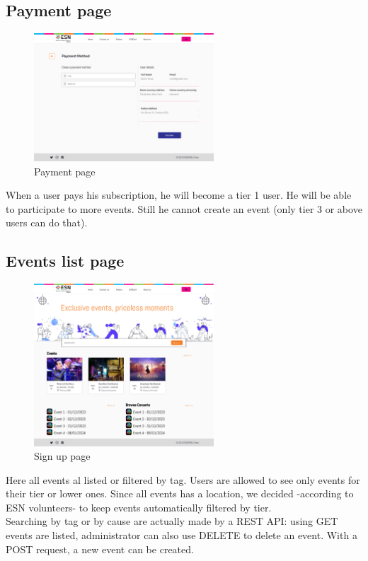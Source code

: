 \subsection{Payment page}
\begin{figure}[H]
    \centering
    \includegraphics[width=0.6\textwidth]{images/PaymentMethod.png}
    \caption{Payment page}
    \label{fig:payment}
\end{figure}
When a user pays his subscription, he will become a tier 1 user. He will be able to participate to more
events. Still he cannot create an event (only tier 3 or above users can do that). 
\subsection{Events list page}
\begin{figure}[H]
    \centering
    \includegraphics[width=0.6\textwidth]{images/EventList.png}
    \caption{Sign up page}
    \label{fig:events}
\end{figure}
Here all events al listed or filtered by tag. Users are allowed to see only events for their tier
or lower ones. Since all events has a location, we decided -according to ESN volunteers- to keep
events automatically filtered by tier.\\
Searching by tag or by cause are actually made by a REST API: using GET events are listed, administrator
can also use DELETE to delete an event. With a POST request, a new event can be created.\\
